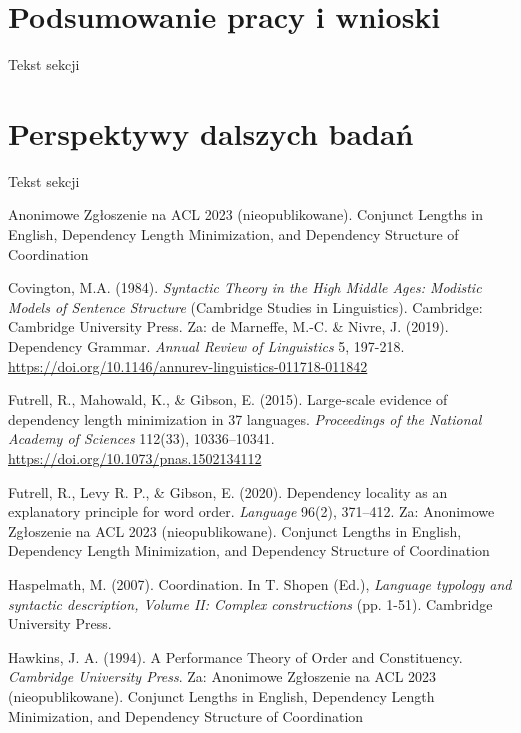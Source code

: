 \documentclass[licencjacka]{pracamgr_Kogni}
\begin{document}
\section{Podsumowanie pracy i wnioski}
Tekst sekcji
\section{Perspektywy dalszych badań}
Tekst sekcji

\begin{thebibliography}{99}

Anonimowe Zgłoszenie na ACL 2023 (nieopublikowane). Conjunct Lengths in English, Dependency Length Minimization, and Dependency Structure of Coordination

Covington, M.A. (1984). \textit{Syntactic Theory in the High Middle Ages: Modistic Models of Sentence Structure}
(Cambridge Studies in Linguistics). Cambridge: Cambridge University Press. Za: de Marneffe, M.-C. \& Nivre, J. (2019). Dependency Grammar. \textit{Annual Review of Linguistics} 5, 197-218. \url{https://doi.org/10.1146/annurev-linguistics-011718-011842}

Futrell, R., Mahowald, K., \& Gibson, E. (2015). Large-scale evidence of dependency length minimization in 37 languages. \textit{Proceedings of the National Academy of Sciences} 112(33), 10336–10341. \url{https://doi.org/10.1073/pnas.1502134112}

Futrell, R., Levy R. P., \& Gibson, E. (2020). Dependency locality as an explanatory principle for word order. \textit{Language} 96(2), 371–412. Za: Anonimowe Zgłoszenie na ACL 2023 (nieopublikowane). Conjunct Lengths in English, Dependency Length Minimization, and Dependency Structure of Coordination

Haspelmath, M. (2007). Coordination. In T. Shopen (Ed.), \textit{Language typology and syntactic description, Volume II: Complex constructions} (pp. 1-51). Cambridge University Press.

Hawkins, J. A. (1994). A Performance Theory of Order and Constituency. \textit{Cambridge University Press}. Za: Anonimowe Zgłoszenie na ACL 2023 (nieopublikowane). Conjunct Lengths in English, Dependency Length Minimization, and Dependency Structure of Coordination


\end{thebibliography}
\end{document}
